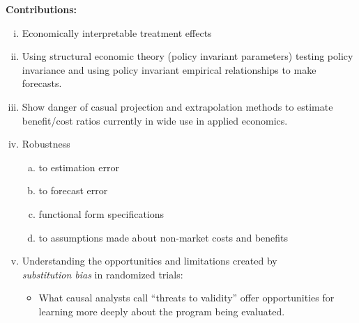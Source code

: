 \documentclass[static]{JJH-Beamer}
\begin{document}
\begin{frame}

\begin{center}
\textbf{Contributions:}
\end{center}
\vspace{-2mm}
\begin{enumerate}[(i)]
\item Economically interpretable treatment effects
\item Using structural economic theory (policy invariant parameters) testing policy invariance and using policy invariant empirical relationships to make forecasts.
\item Show danger of casual projection and extrapolation methods to estimate benefit/cost ratios currently in wide use in applied economics.
\item Robustness
\begin{enumerate}[(a)]
\item to estimation error
\item to forecast error
\item functional form specifications
\item to assumptions made about non-market costs and benefits
\end{enumerate}
\item Understanding the opportunities and limitations created by \\ \emph{substitution bias} in randomized trials:
\begin{itemize}
\item What causal analysts call ``threats to validity'' offer opportunities for learning more deeply about the program being evaluated.
\end{itemize}
\end{enumerate}

\end{frame}
\end{document}
